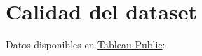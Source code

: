\documentclass{article}
\begin{document}




\clearpage

\appendix


\section{Calidad del dataset} \label{anexo:I}

Datos disponibles en \href{https://public.tableau.com/profile/javier6580\#!/vizhome/proyecto_fin_de_master_dataset/dataset_quality}{Tableau Public}:
\end{document}
